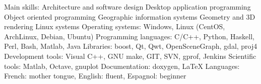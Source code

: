 \begin{cvskills}
  \cvskill
    {Main skills:}
 	{
		Architecture and software design\newline
		Desktop application programming\newline
        Object oriented programming\newline
        Geographic information systems\newline
        Geometry and 3D rendering\newline
        Linux systems
	}
  \cvskill
    {Operating systems:}
 	{Windows, Linux (CentOS, ArchLinux, Debian, Ubuntu)}
  \cvskill
    {Programming languages:}
 	{C/C++, Python, Haskell, Perl, Bash, Matlab, Java}
  \cvskill
    {Libraries:}
 	{boost, Qt, Qwt, OpenSceneGraph, gdal, proj4}
  \cvskill
	{Development tools:}
	{Visual C++, GNU make, GIT, SVN, gprof, Jenkins}
  \cvskill
	{Scientific tools:}
	{Matlab, Octave, gnuplot}
  \cvskill
	{Documentation:}
	{doxygen, \LaTeX}
  \cvskill
    {Languages:}
 	{
        French: mother tongue,
		English: fluent,
		Espagnol: beginner
	}
\end{cvskills}

